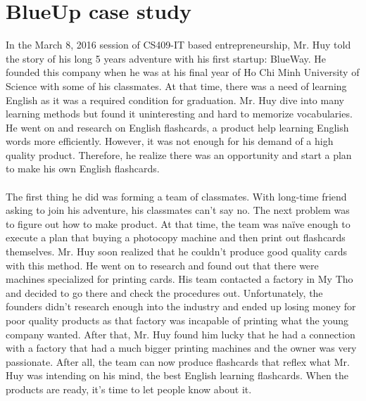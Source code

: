 \documentclass[a4paper, 11pt]{article} %
\begin{document}
\section*{BlueUp case study}
In the March 8, 2016 session of CS409-IT based entrepreneurship, Mr. Huy told the story of his long 5 years adventure with his first startup: BlueWay. He founded this company when he was at his final year of Ho Chi Minh University of Science with some of his classmates. At that time, there was a need of learning English as it was a required condition for graduation. Mr. Huy dive into many learning methods but found it uninteresting and hard to memorize vocabularies. He went on and research on English flashcards, a product help learning English words more efficiently. However, it was not enough for his demand of a high quality product. Therefore, he realize there was an opportunity and start a plan to make his own English flashcards.
\\
\\
The first thing he did was forming a team of classmates. With long-time friend asking to join his adventure, his classmates can't say no. The next problem was to figure out how to make product. At that time, the team was naïve enough to execute a plan that buying a photocopy machine and then print out flashcards themselves. Mr. Huy soon realized that he couldn't produce good quality cards with this method. He went on to research and found out that there were machines specialized for printing cards. His team contacted a factory in My Tho and decided to go there and check the procedures out. Unfortunately, the founders didn't research enough into the industry and ended up losing money for poor quality products as that factory was incapable of printing what the young company wanted. After that, Mr. Huy found him lucky that he had a connection with a factory that had a much bigger printing machines and the owner was very passionate. After all, the team can now produce flashcards that reflex what Mr. Huy was intending on his mind, the best English learning flashcards. When the products are ready, it's time to let people know about it.
\\
\\
\end{document}
